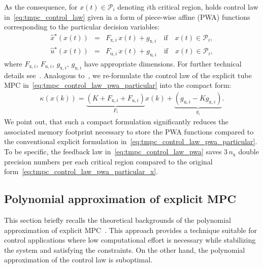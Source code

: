 \documentclass[letterpaper, 10 pt, conference]{ieeeconf}
\begin{document}
	As the consequence, for $x(t) \in \mathcal{P}_{i}$ denoting $i$th critical region, holds control law in~\eqref{eq:tmpc_control_law} given in a form of
	piece-wise affine (PWA) functions corresponding to the particular decision variables:
	\begin{subequations}
		\label{eq:tmpc_control_law_pwa_particular}
		\begin{eqnarray}
			\label{eq:tmpc_control_law_pwa_particular_x}
			\hat{x}^{\star}(x(t)) \!\!\!\!&=&\!\!\!\! F_{\mathrm{x},i} \, x(t) + g_{\mathrm{x},i} \quad \text{if} \quad x(t) \in \mathcal{P}_{i}, \\
			\label{eq:tmpc_control_law_pwa_particular_u}
			\hat{u}^{\star}(x(t)) \!\!\!\!&=&\!\!\!\! F_{\mathrm{u},i} \, x(t) + g_{\mathrm{u},i} \quad \text{if} \quad x(t) \in \mathcal{P}_{i},
		\end{eqnarray}
	\end{subequations}
	where $F_{\mathrm{x},i}$, $F_{\mathrm{u},i}$, $g_{\mathrm{x},i}$, $g_{\mathrm{u},i}$ have appropriate dimensions. For further technical details see~\cite{BM02}. 
	Analogous to~\cite{ZT14}, we re-formulate the control law of the explicit tube MPC in~\eqref{eq:tmpc_control_law_pwa_particular} into the compact form:
	\begin{eqnarray}
		\label{eq:tmpc_control_law_pwa}
		\kappa(x(k)) = \underbrace{ \left( K + F_{\mathrm{x},i} + F_{\mathrm{u},i} \right) }_{ F_{i} } x(k) + \underbrace{ \left( g_{\mathrm{u},i} - K g_{\mathrm{x},i} \right) }_{ g_{i} }.
	\end{eqnarray}
	We point out, that such a compact formulation significantly reduces the associated memory footprint necessary to store the PWA functions compared to the conventional explicit formulation in~\eqref{eq:tmpc_control_law_pwa_particular}.  
	To be specific, the feedback law in~\eqref{eq:tmpc_control_law_pwa} saves $3\,n_\text{x}$ double precision numbers per each critical region compared to the original form~\eqref{eq:tmpc_control_law_pwa_particular_x}.
	
	\subsection{Polynomial approximation of explicit MPC}
	\label{sec:polynomial}
	This section briefly recalls the theoretical backgrounds of the polynomial approximation of explicit MPC~\cite{kvasnica_polynomial}. This approach provides a technique suitable for control applications where low computational effort is necessary while stabilizing the system and satisfying the constraints. On the other hand, the polynomial approximation of the control law is suboptimal. 
	
\end{document}
